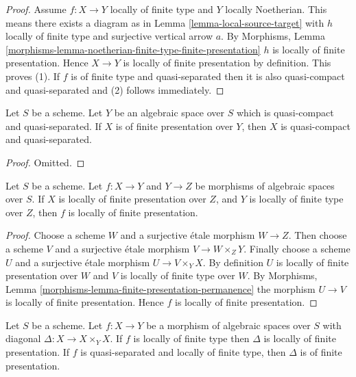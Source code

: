 \begin{proof}
Assume $f : X \to Y$ locally of finite type and $Y$ locally Noetherian.
This means there exists a diagram as in
Lemma \ref{lemma-local-source-target}
with $h$ locally of finite type and surjective vertical arrow $a$. By
Morphisms, Lemma
\ref{morphisms-lemma-noetherian-finite-type-finite-presentation}
$h$ is locally of finite presentation.
Hence $X \to Y$ is locally of finite presentation by definition.
This proves (1).
If $f$ is of finite type and quasi-separated then it is also
quasi-compact and quasi-separated and (2) follows immediately.
\end{proof}

\begin{lemma}
\label{lemma-finite-presentation-quasi-compact-quasi-separated}
Let $S$ be a scheme. Let $Y$ be an algebraic space over $S$ which is
quasi-compact and quasi-separated. If $X$ is of finite presentation over
$Y$, then $X$ is quasi-compact and quasi-separated.
\end{lemma}

\begin{proof}
Omitted.
\end{proof}

\begin{lemma}
\label{lemma-finite-presentation-permanence}
Let $S$ be a scheme.
Let $f : X \to Y$ and $Y \to Z$ be morphisms of algebraic spaces over $S$.
If $X$ is locally of finite presentation over $Z$, and
$Y$ is locally of finite type over $Z$, then $f$ is locally
of finite presentation.
\end{lemma}

\begin{proof}
Choose a scheme $W$ and a surjective \'etale morphism $W \to Z$.
Then choose a scheme $V$ and a surjective \'etale morphism $V \to W \times_Z Y$.
Finally choose a scheme $U$ and a surjective \'etale morphism
$U \to V \times_Y X$. By definition $U$ is locally of finite presentation
over $W$ and $V$ is locally of finite type over $W$. By
Morphisms, Lemma \ref{morphisms-lemma-finite-presentation-permanence}
the morphism $U \to V$ is locally of finite presentation.
Hence $f$ is locally of finite presentation.
\end{proof}

\begin{lemma}
\label{lemma-diagonal-morphism-finite-type}
Let $S$ be a scheme. Let $f : X \to Y$ be a morphism of algebraic spaces
over $S$ with diagonal $\Delta : X \to X \times_Y X$. If $f$ is locally of
finite type then $\Delta$ is locally of finite presentation. If $f$ is
quasi-separated and locally of finite type, then $\Delta$ is of finite
presentation.
\end{lemma}

